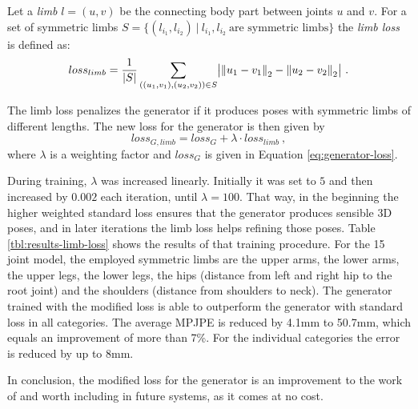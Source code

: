 Let a \emph{limb} $l = (u, v)$ be the connecting body part between joints $u$ and $v$.
For a set of symmetric limbs $S = \{(l_{i_1}, l_{i_2})~|~ l_{i_1}, l_{i_2}\ \text{are symmetric limbs} \}$ the \emph{limb loss} is defined as:
\begin{equation}
loss_{limb} = \frac{1}{|S|}\sum_{((u_1, v_1), (u_2, v_2)) \in S} \bigl\lvert \norm{u_1 - v_1}_2 - \norm{u_2 - v_2}_2 \bigr\rvert \ .
\end{equation}

The limb loss penalizes the generator if it produces poses with symmetric limbs of different lengths.
The new loss for the generator is then given by
\begin{equation}
	loss_{G, limb} = loss_G + \lambda \cdot loss_{limb} \ ,
\end{equation}
where $\lambda$ is a weighting factor and $loss_G$ is given in Equation \eqref{eq:generator-loss}.



During training, $\lambda$ was increased linearly.
Initially it was set to $5$ and then increased by $0.002$ each iteration, until $\lambda = 100$.
That way, in the beginning the higher weighted standard loss ensures that the generator produces sensible 3D poses, and in later iterations the limb loss helps refining those poses.
Table \ref{tbl:results-limb-loss} shows the results of that training procedure.
For the 15 joint model, the employed symmetric limbs are the upper arms, the lower arms, the upper legs, the lower legs, the hips (distance from left and right hip to the root joint) and the shoulders (distance from shoulders to neck). 
The generator trained with the modified loss is able to outperform the generator with standard loss in all categories.
The average MPJPE is reduced by 4.1mm to 50.7mm, which equals an improvement of more than 7\%.
For the individual categories the error is reduced by up to 8mm.

In conclusion, the modified loss for the generator is an improvement to the work of \citet{drover18} and worth including in future systems, as it comes at no cost.




